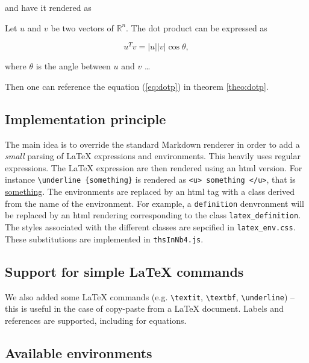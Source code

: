and have it rendered as

\begin{theorem} \label{theo:dotp}
Let \(u\) and \(v\) be two
vectors of \(\mathbb{R}^n\). The dot product can be expressed as


\begin{equation}
\label{eq:dotp}
u^Tv = |u||v| \cos \theta,
\end{equation}


where \(\theta\) is the angle between \(u\) and \(v\)
\ldots{}
\end{theorem} Then one can reference the equation
(\ref{eq:dotp}) in theorem \ref{theo:dotp}.

    \subsection{Implementation principle}\label{implementation-principle}

    The main idea is to override the standard Markdown renderer in order to
add a \emph{small} parsing of LaTeX expressions and environments. This
heavily uses regular expressions. The LaTeX expression are then rendered
using an html version. For instance
\texttt{\textbackslash{}underline\ \{something\}} is rendered as
\texttt{\textless{}u\textgreater{}\ something\ \textless{}/u\textgreater{}},
that is \underline{something}. The environments are replaced by an html
tag with a class derived from the name of the environment. For example,
a \texttt{definition} denvronment will be replaced by an html rendering
corresponding to the class \texttt{latex\_definition}. The styles
associated with the different classes are sepcified in
\texttt{latex\_env.css}. These substitutions are implemented in
\texttt{thsInNb4.js}.

    \subsection{Support for simple LaTeX
commands}\label{support-for-simple-latex-commands}

    We also added some LaTeX commands (e.g. \texttt{\textbackslash{}textit},
\texttt{\textbackslash{}textbf}, \texttt{\textbackslash{}underline}) --
this is useful in the case of copy-paste from a LaTeX document. Labels
and references are supported, including for equations.

    \subsection{Available environments}\label{available-environments}

